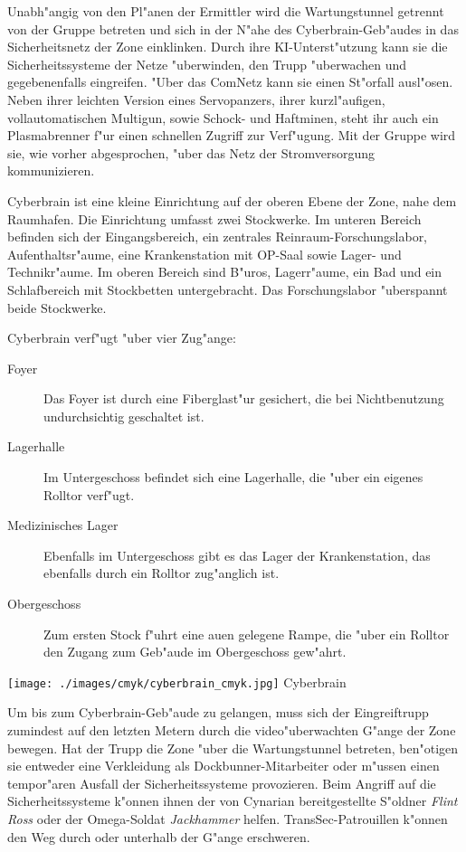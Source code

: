 Unabh"angig von den Pl"anen der Ermittler wird \xl{} die Wartungstunnel getrennt von der Gruppe betreten und sich in der N"ahe des Cyberbrain-Geb"audes in das Sicherheitsnetz der Zone einklinken. Durch ihre KI-Unterst"utzung kann sie die Sicherheitssysteme der Netze "uberwinden, den Trupp "uberwachen und gegebenenfalls eingreifen. "Uber das ComNetz kann sie einen St"orfall ausl"osen. Neben ihrer leichten Version eines Servopanzers, ihrer kurzl"aufigen, vollautomatischen Multigun, sowie Schock- und Haftminen, steht ihr auch ein Plasmabrenner f"ur einen schnellen Zugriff zur Verf"ugung. Mit der Gruppe wird sie, wie vorher abgesprochen, "uber das Netz der Stromversorgung kommunizieren.

Cyberbrain ist eine kleine Einrichtung auf der oberen Ebene der Zone, nahe dem Raumhafen. Die Einrichtung umfasst zwei Stockwerke. Im unteren Bereich befinden sich der Eingangsbereich, ein zentrales Reinraum-Forschungslabor, Aufenthaltsr"aume, eine Krankenstation mit OP-Saal sowie Lager- und Technikr"aume. Im oberen Bereich sind B"uros, Lagerr"aume, ein Bad und ein Schlafbereich mit Stockbetten untergebracht. Das Forschungslabor "uberspannt beide Stockwerke.

Cyberbrain verf"ugt "uber vier Zug"ange:

\begin{description}
	\item[Foyer] Das Foyer ist durch eine Fiberglast"ur gesichert, die bei Nichtbenutzung undurchsichtig geschaltet ist.
	\item[Lagerhalle] Im Untergeschoss befindet sich eine Lagerhalle, die "uber ein eigenes Rolltor verf"ugt.
	\item[Medizinisches Lager] Ebenfalls im Untergeschoss gibt es das Lager der Krankenstation, das ebenfalls durch ein Rolltor zug"anglich 		ist.
	\item[Obergeschoss] Zum ersten Stock f"uhrt eine au\3en gelegene Rampe, die "uber ein Rolltor den Zugang zum Geb"aude im Obergeschoss 	
		gew"ahrt.
\end{description}

\begin{figure*}[htbp]
	\centering
    \texttt{[image: ./images/cmyk/cyberbrain\_cmyk.jpg]}
    \newline{}Cyberbrain
	\label{fig:cyberbrain}
\end{figure*}

Um bis zum Cyberbrain-Geb"aude zu gelangen, muss sich der Eingreiftrupp zumindest auf den letzten Metern durch die video"uberwachten G"ange der Zone bewegen. Hat der Trupp die Zone "uber die Wartungstunnel betreten, ben"otigen sie entweder eine Verkleidung als Dockbunner-Mitarbeiter oder m"ussen einen tempor"aren Ausfall der Sicherheitssysteme provozieren. Beim Angriff auf die Sicherheitssysteme k"onnen ihnen der von Cynarian bereitgestellte S"oldner \emph{Flint Ross} oder der Omega-Soldat \emph{Jackhammer} helfen. TransSec-Patrouillen k"onnen den Weg durch oder unterhalb der G"ange erschweren.

